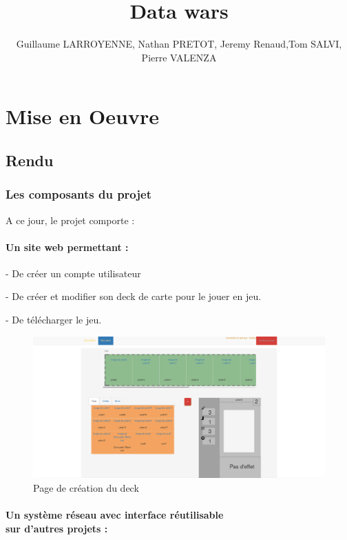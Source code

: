 \documentclass[a4paper,11pt]{report}
\title{Data wars}
\author{Guillaume LARROYENNE, Nathan PRETOT, Jeremy Renaud,Tom SALVI, Pierre VALENZA}
\begin{document}
\maketitle
\tableofcontents

\begin{abstract}
\end{abstract}

\chapter{Mise en Oeuvre}



\section{Rendu}
\subsection{Les composants du projet}
A ce jour, le projet comporte :

	\subsubsection{Un site web permettant :}
	
	 - De créer un compte utilisateur
		 
	 - De créer et modifier son deck de carte pour le jouer en jeu.
	 
	 - De télécharger le jeu.
	 \begin{figure}[th]
	 \begin{center}
	  \includegraphics[scale=0.2]{Assets/site.png} 
	\caption{Page de création du deck}
     \label{siteWeb}
      \end{center}
    \end{figure}

	
	\subsubsection{Un système réseau avec interface réutilisable\\ sur d'autres 			projets :}
	
\end{document}
